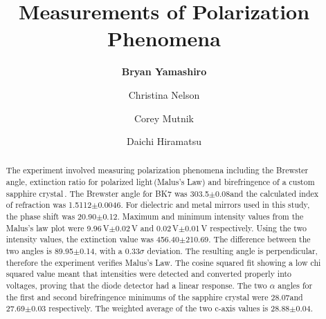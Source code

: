 \documentclass[aps,prl,twocolumn,superscriptaddress,nofootinbib]{revtex4-1}
\begin{document}





\title{Measurements of Polarization Phenomena}


\author{\textbf{Bryan Yamashiro}}
\author{Christina Nelson}
\author{Corey Mutnik}
\author{Daichi Hiramatsu}






\begin{abstract}

The experiment involved measuring polarization phenomena including the Brewster angle, extinction ratio for polarized light\,(Malus's Law) and birefringence of a custom sapphire crystal\,\cite{1}. The Brewster angle for BK7 was 303.5\degree$\pm$0.08\degree and the calculated index of refraction was 1.5112$\pm$0.0046. For dielectric and metal mirrors used in this study, the phase shift was 20.90\degree$\pm$0.12\degree. Maximum and minimum intensity values from the Malus's law plot were 9.96\,V$\pm$0.02\,V and 0.02\,V$\pm$0.01\,V respectively. Using the two intensity values, the extinction value was 456.40$\pm$210.69. The difference between the two angles is 89.95\degree$\pm$0.14\degree, with a 0.33$\sigma$ deviation. The resulting angle is perpendicular, therefore the experiment verifies Malus's Law. The cosine squared fit showing a low chi squared value meant that intensities were detected and converted properly into voltages, proving that the diode detector had a linear response. The two $\alpha$ angles for the first and second birefringence minimums of the sapphire crystal were 28.07\degree and 27.69\degree$\pm$0.03 respectively. The weighted average of the two c-axis values is 28.88\degree$\pm$0.04\degree.

\end{abstract}
\end{document}
